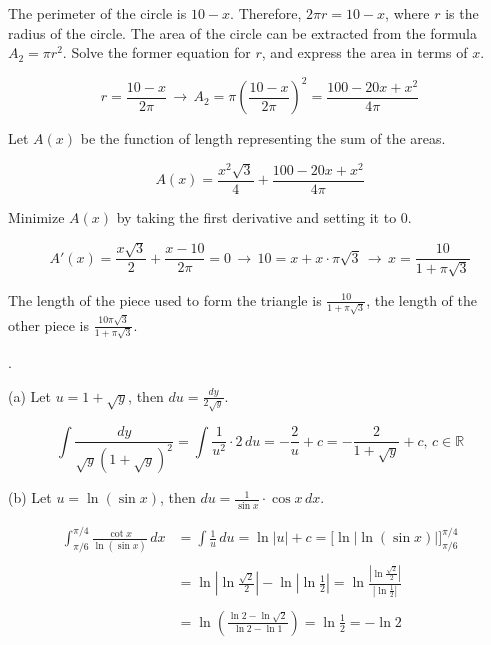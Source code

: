 \documentclass{article}
\begin{document}
\hfill

\noindent The perimeter of the circle is $10-x$. Therefore, $2\pi r = 10-x$, where $r$ is the radius of the circle. The area of the circle can be extracted from the formula $A_2=\pi r^2$. Solve the former equation for $r$, and express the area in terms of $x$.

\begin{equation*}
    r=\frac{10-x}{2\pi}\,\rightarrow\, A_2 = \pi\left(\frac{10-x}{2\pi}\right)^2 =\frac{100-20x+x^2}{4\pi}
\end{equation*}

\hfill

\noindent Let $A(x)$ be the function of length representing the sum of the areas.

\begin{equation*}
    A(x) = \frac{x^2\sqrt3}{4}+\frac{100-20x+x^2}{4\pi}
\end{equation*}

\hfill

\noindent Minimize $A(x)$ by taking the first derivative and setting it to $0$.

\begin{equation*}
A'(x)=\frac{x\sqrt3}{2} + \frac{x-10}{2\pi}=0\,\rightarrow\,10=x+x\cdot\pi\sqrt3\,\rightarrow\,x=\frac{10}{1+\pi\sqrt3}
\end{equation*}

\hfill

\noindent The length of the piece used to form the triangle is $\displaystyle\frac{10}{1+\pi\sqrt3}$, the length of the other piece is $\displaystyle\frac{10\pi\sqrt3}{1+\pi\sqrt3}$.

\hfill

.

\hfill

\noindent (a) Let $u=1+\sqrt y$, then $\displaystyle du=\frac{dy}{2\sqrt y}$.

\begin{equation*}
\int\frac{dy}{\sqrt{y}\left(1+\sqrt y\right)^2}=\int\frac{1}{u^2}\cdot2\,du=-\frac{2}{u}+c=\boxed{-\frac{2}{1+\sqrt y}+c,\,c\in\mathbb{R}}
\end{equation*}

\hfill

\noindent (b) Let $u=\ln(\sin x)$, then $\displaystyle du=\frac{1}{\sin x}\cdot \cos x\,dx$.

\begin{align*}
\int_{\pi/6}^{\pi/4}\frac{\cot x}{\ln(\sin x)}\,dx&=\int\frac1u\,du=\ln|u| + c=\Big[\ln\left|\ln(\sin x)\right| \Big]_{\pi/6}^{\pi/4}\\\\&=\ln\left|\ln\frac{\sqrt2}2\right|-\ln\left|\ln\frac12\right|=\ln\frac{\left|\ln\frac{\sqrt2}{2}\right|}{\left|\ln\frac12\right|}\\\\&=\ln\left(\frac{\ln2-\ln\sqrt2}{\ln2-\ln1}\right)=\ln\frac12=\boxed{-\ln2}
\end{align*}
\end{document}
